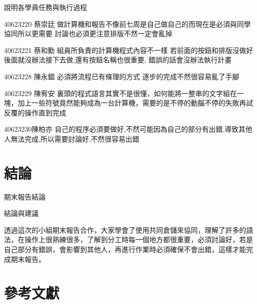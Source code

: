 \documentclass[12pt,,]{report}
\begin{document}
說明各學員任務與執行過程

40623220 蔡崇廷
做計算機和報告不像前七周是自己做自己的而現在是必須與同學協同所以更需要
討論也必須更注意排版不然一定會亂掉

40623221 蔡和勳 組員所負責的計算機程式內容不一樣
若前面的按鈕和排版沒做好後面就沒辦法接下去做,還有按鈕名稱也很重要,
錯誤的話會沒辦法執行計畫

40623228 陳永錩 必須將流程已有條理的方式 逐步的完成不然很容易亂了手腳

40623229 陳宥安
裏頭的程式語言其實不是很懂，如何能將一整串的文字組在一塊，加上一些符號竟然能夠成為一台計算機，需要的是不停的動腦不停的失敗再試反覆的操作直到完成

40623230陳柏亦
自己的程序必須要做好,不然可能因為自己的部分有出錯,導致其他人無法完成,所以需要討論好,不然很容易出錯

\hypertarget{ux7d50ux8ad6}{%
\chapter{結論}\label{ux7d50ux8ad6}}

期末報告結論

結論與建議

透過這次的小組期末報告合作，大家學會了使用共同倉儲來協同，理解了許多的語法，在操作上很熟練很多，了解到分工時每一個地方都很重要，必須討論好，若是自己部分有錯誤，會影響到其他人，再進行作業時必須確保不會出錯，這樣才能完成期末報告。

\hypertarget{ux53c3ux8003ux6587ux737b}{%
\chapter{參考文獻}\label{ux53c3ux8003ux6587ux737b}}
\end{document}
